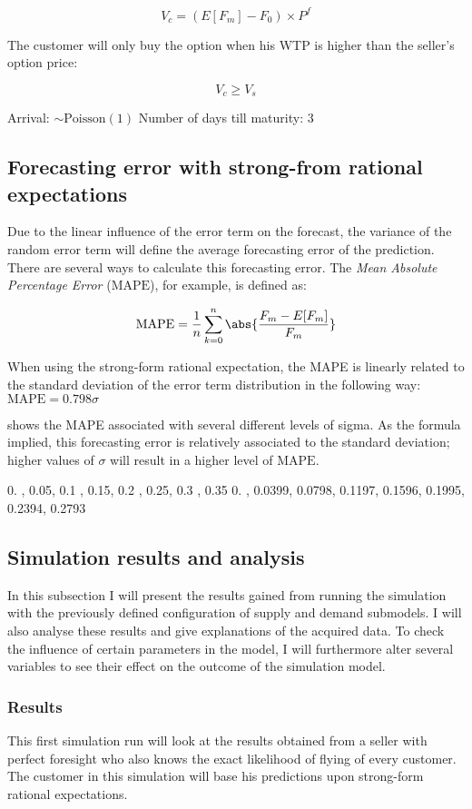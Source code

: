 $$ V_c = (E[F_m] - F_0) \times P^f $$

The customer will only buy the option when his WTP is higher than the seller's option price:

$$ V_c \ge V_s $$


Arrival: $ \sim \mbox{Poisson}(1)$
Number of days till maturity: 3


\subsection{Forecasting error with strong-from rational expectations}
Due to the linear influence of the error term on the forecast, the variance of the random error term will define the average forecasting error of the prediction. There are several ways to calculate this forecasting error. The \emph{Mean Absolute Percentage Error} ($\mbox{MAPE}$), for example, is defined as:

$$ \mbox{MAPE} = \frac{1}{n} \sum\limits_{k=0}^n \abs{\frac{F_m - E[F_m]}{F_m}} $$

When using the strong-form rational expectation, the MAPE is linearly related to the standard deviation of the error term distribution in the following way: $ \mbox{MAPE} = 0.798 \sigma $

 shows the MAPE associated with several different levels of sigma. As the formula implied, this forecasting error is relatively associated to the standard deviation; higher values of $\sigma$ will result in a higher level of $\mbox{MAPE}$.

0.  ,  0.05,  0.1 ,  0.15,  0.2 ,  0.25,  0.3 ,  0.35
0.    ,  0.0399,  0.0798,  0.1197,  0.1596,  0.1995,  0.2394, 0.2793

\subsection{Simulation results and analysis}
In this subsection I will present the results gained from running the simulation with the previously defined configuration of supply and demand submodels. I will also analyse these results and give explanations of the acquired data. To check the influence of certain parameters in the model, I will furthermore alter several variables to see their effect on the outcome of the simulation model.

\subsubsection{Results}
This first simulation run will look at the results obtained from a seller with perfect foresight who also knows the exact likelihood of flying of every customer. The customer in this simulation will base his predictions upon strong-form rational expectations.

